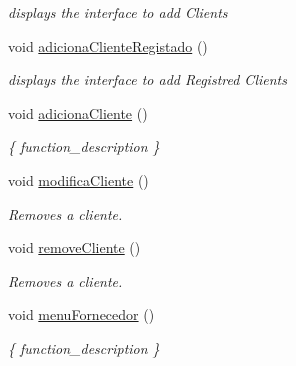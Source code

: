 \begin{DoxyCompactItemize}
\begin{DoxyCompactList}\small\item\em displays the interface to add Clients \end{DoxyCompactList}\item 
\mbox{\label{classEmpresa_a430c00a63ef70338de3b4b7c096ea194}} 
void \hyperlink{classEmpresa_a430c00a63ef70338de3b4b7c096ea194}{adiciona\+Cliente\+Registado} ()
\begin{DoxyCompactList}\small\item\em displays the interface to add Registred Clients \end{DoxyCompactList}\item 
\mbox{\label{classEmpresa_aba4af6a945948ac66e771a416cfc2a2a}} 
void \hyperlink{classEmpresa_aba4af6a945948ac66e771a416cfc2a2a}{adiciona\+Cliente} ()
\begin{DoxyCompactList}\small\item\em \{ function\+\_\+description \} \end{DoxyCompactList}\item 
\mbox{\label{classEmpresa_a9b938f2436e95e68afce6cc04f2100bc}} 
void \hyperlink{classEmpresa_a9b938f2436e95e68afce6cc04f2100bc}{modifica\+Cliente} ()
\begin{DoxyCompactList}\small\item\em Removes a cliente. \end{DoxyCompactList}\item 
\mbox{\label{classEmpresa_ab9af9446d6d2c206b4b3e18e1bcb6475}} 
void \hyperlink{classEmpresa_ab9af9446d6d2c206b4b3e18e1bcb6475}{remove\+Cliente} ()
\begin{DoxyCompactList}\small\item\em Removes a cliente. \end{DoxyCompactList}\item 
\mbox{\label{classEmpresa_adb9d8d4aa55f253fc534e220ca4a87ac}} 
void \hyperlink{classEmpresa_adb9d8d4aa55f253fc534e220ca4a87ac}{menu\+Fornecedor} ()
\begin{DoxyCompactList}\small\item\em \{ function\+\_\+description \} \end{DoxyCompactList}\item 
\mbox{\label{classEmpresa_af20261a3f95a5dd0c4a5a796d9a3d442}} 

\end{DoxyCompactItemize}
